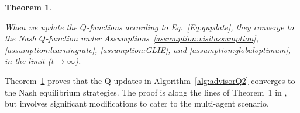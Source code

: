 \documentclass[jair, twoside,11pt,theapa]{article}
\newtheorem{theorem}{Theorem}
\begin{document}
% 

\begin{theorem}\label{theorem:onpolicy}

When we update the $Q$-functions according to Eq.~\ref{Eq:qupdate}, they converge to the Nash $Q$-function under Assumptions~\ref{assumption:visitassumption}, \ref{assumption:learningrate}, \ref{assumption:GLIE}, and \ref{assumption:globaloptimum}, in the limit ($t \xrightarrow{} \infty$).

\end{theorem}

Theorem~\ref{theorem:onpolicy} proves that the Q-updates in Algorithm~\ref{alg:advisorQ2} converges to the Nash equilibrium strategies. The proof is along the lines of Theorem~1 in \cite{singh2000convergence}, but involves significant modifications to cater to the multi-agent scenario.  
\end{document}
